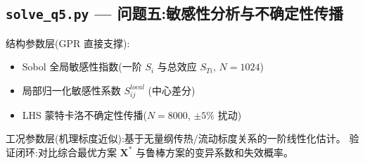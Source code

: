 \newpage
\subsection{\texttt{solve\_q5.py} — 问题五:敏感性分析与不确定性传播}

结构参数层(GPR 直接支撑):
\begin{itemize}
    \item Sobol 全局敏感性指数(一阶 $S_i$ 与总效应 $S_{Ti}$, $N=1024$)
    \item 局部归一化敏感性系数 $S_{ij}^{local}$ (中心差分)
    \item LHS 蒙特卡洛不确定性传播($N=8000$, $\pm5\%$ 扰动)
\end{itemize}
工况参数层(机理标度近似):基于无量纲传热/流动标度关系的一阶线性化估计。
验证闭环:对比综合最优方案 $\mathbf{X}^*$ 与鲁棒方案的变异系数和失效概率。



